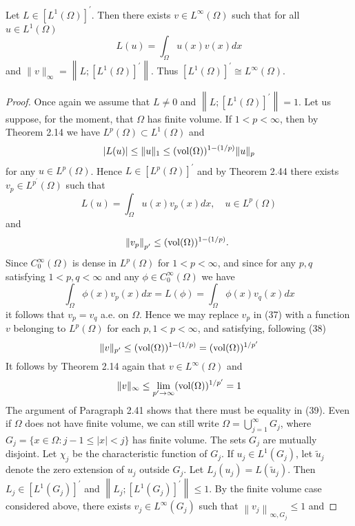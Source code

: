 \begin{theorem}
  Let $L \in\left[L^1(\Omega)\right]^{\prime}$. Then there exists $v \in L^{\infty}(\Omega)$ such that for all $u \in L^1(\Omega)$
  \[
  L(u)=\int_{\Omega} u(x) v(x) d x
  \]
  and $\|v\|_{\infty}=\left\|L ;\left[L^1(\Omega)\right]^{\prime}\right\|$. Thus $\left[L^1(\Omega)\right]^{\prime} \cong L^{\infty}(\Omega)$.
\end{theorem}

\begin{proof}
  Once again we assume that $L \neq 0$ and $\left\|L ;\left[L^1(\Omega)\right]^{\prime}\right\|=1$. Let us suppose, for the moment, that $\Omega$ has finite volume. If $1<p<\infty$, then by Theorem 2.14 we have $L^p(\Omega) \subset L^1(\Omega)$ and
  \[
  |L(u)| \leq\|u\|_1 \leq(\operatorname{vol}(\Omega))^{1-(1 / p)}\|u\|_p
  \]
  for any $u \in L^p(\Omega)$. Hence $L \in\left[L^p(\Omega)\right]^{\prime}$ and by Theorem 2.44 there exists $v_p \in L^{p^{\prime}}(\Omega)$ such that
  \[
  L(u)=\int_{\Omega} u(x) v_p(x) d x, \quad u \in L^p(\Omega)
  \]
  and
  \[
  \left\|v_p\right\|_{p^{\prime}} \leq(\operatorname{vol}(\Omega))^{1-(1 / p)} \text {. }
  \]
  Since $C_0^{\infty}(\Omega)$ is dense in $L^p(\Omega)$ for $1<p<\infty$, and since for any $p, q$ satisfying $1<p, q<\infty$ and any $\phi \in C_0^{\infty}(\Omega)$ we have
  \[
  \int_{\Omega} \phi(x) v_p(x) d x=L(\phi)=\int_{\Omega} \phi(x) v_q(x) d x
  \]
  it follows that $v_p=v_q$ a.e. on $\Omega$. Hence we may replace $v_p$ in (37) with a function $v$ belonging to $L^p(\Omega)$ for each $p, 1<p<\infty$, and satisfying, following (38)
  \[
  \|v\|_{p^{\prime}} \leq(\operatorname{vol}(\Omega))^{1-(1 / p)}=(\operatorname{vol}(\Omega))^{1 / p^{\prime}}
  \]
  It follows by Theorem 2.14 again that $v \in L^{\infty}(\Omega)$ and
  \[
  \|v\|_{\infty} \leq \lim _{p^{\prime} \rightarrow \infty}(\operatorname{vol}(\Omega))^{1 / p^{\prime}}=1
  \]
  The argument of Paragraph 2.41 shows that there must be equality in (39).
  Even if $\Omega$ does not have finite volume, we can still write $\Omega=\bigcup_{j=1}^{\infty} G_j$, where $G_j=\{x \in \Omega: j-1 \leq|x|<j\}$ has finite volume. The sets $G_j$ are mutually disjoint. Let $\chi_j$ be the characteristic function of $G_j$. If $u_j \in L^1\left(G_j\right)$, let $\tilde{u}_j$ denote the zero extension of $u_j$ outside $G_j$. Let $L_j\left(u_j\right)=L\left(\tilde{u}_j\right)$. Then $L_j \in\left[L^1\left(G_j\right)\right]^{\prime}$ and $\left\|L_j ;\left[L^1\left(G_j\right)\right]^{\prime}\right\| \leq 1$. By the finite volume case considered above, there exists $v_j \in L^{\infty}\left(G_j\right)$ such that $\left\|v_j\right\|_{\infty, G_j} \leq 1$ and

\end{proof}
